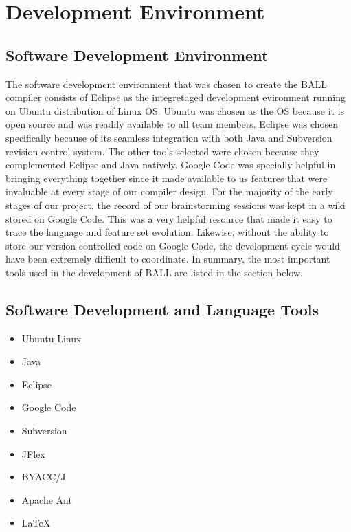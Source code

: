 \chapter{Development Environment}\label{DevelEnv}

\section{Software Development Environment}

The software development environment that was chosen to create the
BALL compiler consists of Eclipse as the integretaged development evironment 
running on Ubuntu distribution of Linux OS. Ubuntu was chosen as the 
OS because it is open source and was readily available to all team members. 
Eclipse was chosen specifically because of its seamless integration with 
both Java and Subversion revision control system. The other tools selected
were chosen because they complemented Eclipse and Java natively.
Google Code was specially helpful in bringing everything
together since it made available to us features that were invaluable
at every stage of our compiler design. For the majority of the early
stages of our project, the record of our brainstorming sessions was
kept in a wiki stored on Google Code. This was a very helpful resource
that made it easy to trace the language and feature set
evolution. Likewise, without the ability to store our version
controlled code on Google Code, the development cycle would have been
extremely difficult to coordinate. In summary, the most important tools
used in the development of BALL are listed in the section below.

\section{Software Development and Language Tools}

\begin{itemize}

\item Ubuntu Linux
\item Java
\item Eclipse
\item Google Code
\item Subversion
\item JFlex
\item BYACC/J
\item Apache Ant
\item LaTeX

\end{itemize}


